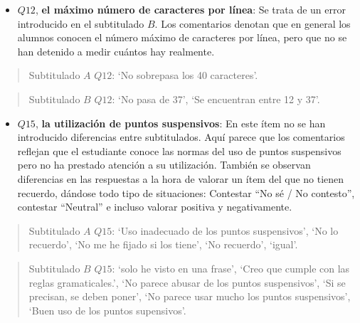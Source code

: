 \documentclass[
  12pt,
  a4paper,
  extrafontsizes,
  onecolumn,
  openright,
  table]{memoir}
\providecommand{\tightlist}{%
  \setlength{\itemsep}{0pt}\setlength{\parskip}{0pt}}\usepackage{longtable,booktabs,array}
\begin{document}
\color{black}
\normalsize

\begin{itemize}
\tightlist
\item
  \(Q12\), \textbf{el máximo número de caracteres por línea}: Se trata
  de un error introducido en el subtitulado \(B\). Los comentarios
  denotan que en general los alumnos conocen el número máximo de
  caracteres por línea, pero que no se han detenido a medir cuántos hay
  realmente.
\end{itemize}

\scriptsize
\color{blue}

\begin{quote}
Subtitulado \(A\) \(Q12\): \enquote*{No sobrepasa los 40 caracteres}.
\end{quote}

\color{black}
\normalsize

\scriptsize
\color{red}

\begin{quote}
Subtitulado \(B\) \(Q12\): \enquote*{No pasa de 37}, \enquote*{Se
encuentran entre 12 y 37}.
\end{quote}

\color{black}
\normalsize

\begin{itemize}
\tightlist
\item
  \(Q15\), \textbf{la utilización de puntos suspensivos}: En este ítem
  no se han introducido diferencias entre subtitulados. Aquí parece que
  los comentarios reflejan que el estudiante conoce las normas del uso
  de puntos suspensivos pero no ha prestado atención a su utilización.
  También se observan diferencias en las respuestas a la hora de valorar
  un ítem del que no tienen recuerdo, dándose todo tipo de situaciones:
  Contestar \enquote{No sé / No contesto}, contestar \enquote{Neutral} e
  incluso valorar positiva y negativamente.
\end{itemize}

\scriptsize
\color{blue}

\begin{quote}
Subtitulado \(A\) \(Q15\): \enquote*{Uso inadecuado de los puntos
suspensivos}, \enquote*{No lo recuerdo}, \enquote*{No me he fijado si
los tiene}, \enquote*{No recuerdo}, \enquote*{igual}.
\end{quote}

\color{black}
\normalsize

\scriptsize
\color{red}

\begin{quote}
Subtitulado \(B\) \(Q15\): \enquote*{solo he visto en una frase},
\enquote*{Creo que cumple con las reglas gramaticales.}, \enquote*{No
parece abusar de los puntos suspensivos}, \enquote*{Si se precisan, se
deben poner}, \enquote*{No parece usar mucho los puntos suspensivos},
\enquote*{Buen uso de los puntos supensivos}.
\end{quote}
\end{document}
